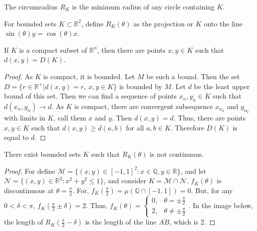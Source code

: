 \documentclass[crop=false,class=article,oneside]{standalone}
\begin{document}
        \begin{definition}
        The circumradius $R_K$ is the minimum radius of any circle containing $K$.
        \end{definition}
        \begin{notation}
        For bounded sets $K\subset \mathbb{R}^2$, define $R_K(\theta)$ as the projection or $K$ onto the line $\sin(\theta)y=\cos(\theta)x$.
        \end{notation}
        \begin{theorem}
        If $K$ is a compact subset of $\mathbb{R}^n$, then there are points $x,y\in K$ such that $d(x,y)=D(K)$.
        \end{theorem}
        \begin{proof}
        As $K$ is compact, it is bounded. Let $M$ be such a bound. Then the set $D=\{r\in \mathbb{R}^+| d(x,y) = r,\ x,y\in K\}$ is bounded by $M$. Let $d$ be the least upper bound of this set. Then we can find a sequence of points $x_n,y_n\in K$ such that $d(x_n,y_n) \rightarrow d$. As $K$ is compact, there are convergent subsequence $x_{n_k}$ and $y_{n_k}$ with limits in $K$, call them $x$ and $y$. Then $d(x,y) = d$. Thus, there are points $x,y\in K$ such that $d(x,y) \geq d(a,b)$ for all $a,b\in K$. Therefore $D(K)$ is equal to $d$.
        \end{proof}
        \begin{theorem}
        There exist bounded sets $K$ such that $R_K(\theta)$ is not continuous.
        \end{theorem}
        \begin{proof}
        For define $\mathcal{M} = \{(x,y)\in [-1,1]^2: x\in \mathbb{Q},y\in \mathbb{R}\}$, and let $\mathcal{N} = \{(x,y)\in \mathbb{R}^2: x^2+y^2\leq 1\}$, and consider $K = \mathcal{M}\cap \mathcal{N}$. $f_{K}(\theta)$ is discontinuous at $\theta = \frac{\pi}{2}$. For, $f_K(\frac{\pi}{2}) = \mu(\mathbb{Q}\cap [-1,1])=0$. But, for any $0<\delta < \pi$, $f_K(\frac{\pi}{2}\pm\delta) = 2$. Thus, $f_K(\theta) = \begin{cases} 0, & \theta = \pm \frac{\pi}{2} \\ 2, & \theta \ne \pm \frac{\pi}{2}\end{cases}$. In the image below, the length of $R_K(\frac{\pi}{2}-\delta)$ is the length of the line $\overline{AB}$, which is 2.
        \end{proof}
\end{document}
